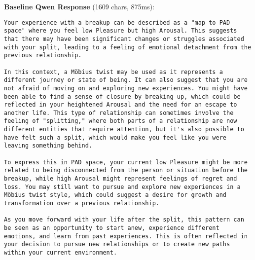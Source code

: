 \documentclass[11pt,a4paper]{article}
\begin{document}
\textbf{Baseline Qwen Response} (1609 chars, 875ms):
\begin{verbatim}Your experience with a breakup can be described as a "map to PAD space" where you feel low Pleasure but high Arousal. This suggests that there may have been significant changes or struggles associated with your split, leading to a feeling of emotional detachment from the previous relationship.

In this context, a Möbius twist may be used as it represents a different journey or state of being. It can also suggest that you are not afraid of moving on and exploring new experiences. You might have been able to find a sense of closure by breaking up, which could be reflected in your heightened Arousal and the need for an escape to another life. This type of relationship can sometimes involve the feeling of "splitting," where both parts of a relationship are now different entities that require attention, but it's also possible to have felt such a split, which would make you feel like you were leaving something behind.

To express this in PAD space, your current low Pleasure might be more related to being disconnected from the person or situation before the breakup, while high Arousal might represent feelings of regret and loss. You may still want to pursue and explore new experiences in a Möbius twist style, which could suggest a desire for growth and transformation over a previous relationship.

As you move forward with your life after the split, this pattern can be seen as an opportunity to start anew, experience different emotions, and learn from past experiences. This is often reflected in your decision to pursue new relationships or to create new paths within your current environment.
\end{verbatim}
\end{document}
